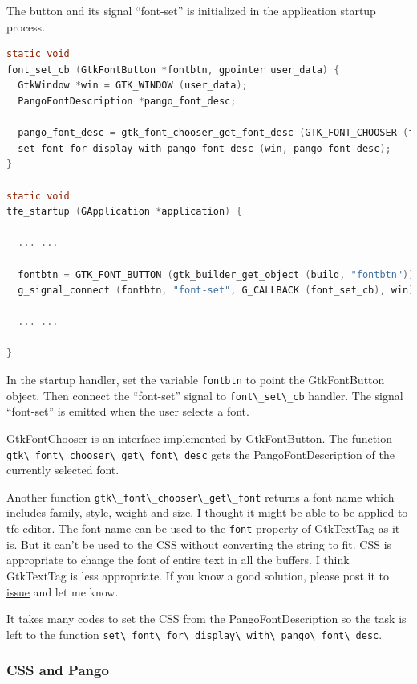 The button and its signal ``font-set'' is initialized in the application
startup process.

\begin{lstlisting}[language=C]
static void
font_set_cb (GtkFontButton *fontbtn, gpointer user_data) {
  GtkWindow *win = GTK_WINDOW (user_data);
  PangoFontDescription *pango_font_desc;

  pango_font_desc = gtk_font_chooser_get_font_desc (GTK_FONT_CHOOSER (fontbtn));
  set_font_for_display_with_pango_font_desc (win, pango_font_desc);
}

static void
tfe_startup (GApplication *application) {

  ... ...

  fontbtn = GTK_FONT_BUTTON (gtk_builder_get_object (build, "fontbtn"));
  g_signal_connect (fontbtn, "font-set", G_CALLBACK (font_set_cb), win);

  ... ...

}
\end{lstlisting}

In the startup handler, set the variable
\passthrough{\lstinline!fontbtn!} to point the GtkFontButton object.
Then connect the ``font-set'' signal to
\passthrough{\lstinline!font\_set\_cb!} handler. The signal ``font-set''
is emitted when the user selects a font.

GtkFontChooser is an interface implemented by GtkFontButton. The
function \passthrough{\lstinline!gtk\_font\_chooser\_get\_font\_desc!}
gets the PangoFontDescription of the currently selected font.

Another function \passthrough{\lstinline!gtk\_font\_chooser\_get\_font!}
returns a font name which includes family, style, weight and size. I
thought it might be able to be applied to tfe editor. The font name can
be used to the \passthrough{\lstinline!font!} property of GtkTextTag as
it is. But it can't be used to the CSS without converting the string to
fit. CSS is appropriate to change the font of entire text in all the
buffers. I think GtkTextTag is less appropriate. If you know a good
solution, please post it to
\href{https://github.com/ToshioCP/Gtk4-tutorial/issues}{issue} and let
me know.

It takes many codes to set the CSS from the PangoFontDescription so the
task is left to the function
\passthrough{\lstinline!set\_font\_for\_display\_with\_pango\_font\_desc!}.

\hypertarget{css-and-pango}{%
\subsubsection{CSS and Pango}\label{css-and-pango}}

